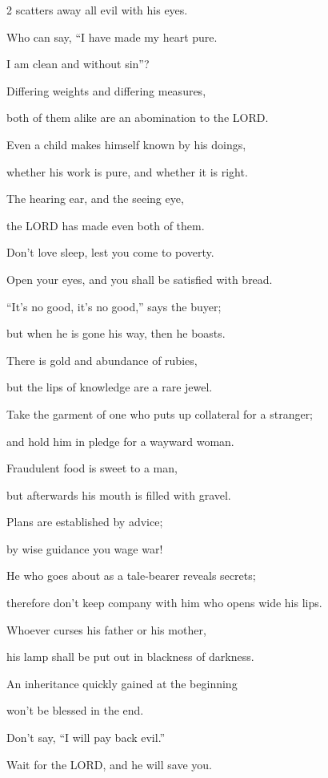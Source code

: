 \begin{multicols}{2}
scatters away all evil with his eyes.


\myverse{}Who can say, “I have made my heart pure.

I am clean and without sin”?


\myverse{}Differing weights and differing measures,

both of them alike are an abomination to the LORD.


\myverse{}Even a child makes himself known by his doings,

whether his work is pure, and whether it is right.


\myverse{}The hearing ear, and the seeing eye,

the LORD has made even both of them.


\myverse{}Don’t love sleep, lest you come to poverty.

Open your eyes, and you shall be satisfied with bread.


\myverse{}“It’s no good, it’s no good,” says the buyer;

but when he is gone his way, then he boasts.


\myverse{}There is gold and abundance of rubies,

but the lips of knowledge are a rare jewel.


\myverse{}Take the garment of one who puts up collateral for a stranger;

and hold him in pledge for a wayward woman.


\myverse{}Fraudulent food is sweet to a man,

but afterwards his mouth is filled with gravel.


\myverse{}Plans are established by advice;

by wise guidance you wage war!


\myverse{}He who goes about as a tale-bearer reveals secrets;

therefore don’t keep company with him who opens wide his lips.


\myverse{}Whoever curses his father or his mother,

his lamp shall be put out in blackness of darkness.


\myverse{}An inheritance quickly gained at the beginning

won’t be blessed in the end.


\myverse{}Don’t say, “I will pay back evil.”

Wait for the LORD, and he will save you.



\end{multicols}
